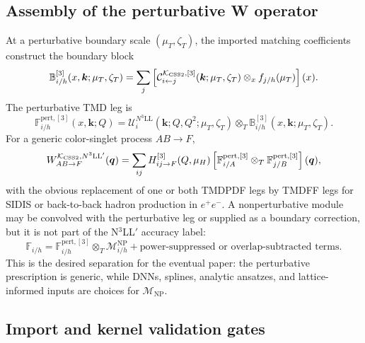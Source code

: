 \documentclass[11pt]{article}
\newcommand{\bk}{\bm{k}}
\newcommand{\bq}{\bm{q}}
\newcommand{\ot}{\otimes_T}
\newcommand{\ox}{\otimes_x}
\newcommand{\NP}{\mathrm{NP}}
\newcommand{\pert}{\mathrm{pert}}
\newcommand{\KCSS}{\mathcal K_{\rm CSS2}}
\begin{document}
\subsection{Assembly of the perturbative W operator}

At a perturbative boundary scale \((\mu_T,\zeta_T)\), the imported matching coefficients
construct the boundary block
\begin{equation}
  \mathbb B_{i/h}^{[3]}(x,\bk;\mu_T,\zeta_T)
  =
  \sum_j
  \left[
  \mathcal C_{i\leftarrow j}^{\KCSS,[3]}(\bk;\mu_T,\zeta_T)
  \ox f_{j/h}(\mu_T)
  \right](x).
  \label{eq:B-boundary-N3-v14}
\end{equation}
The perturbative TMD leg is
\begin{equation}
  \mathbb F_{i/h}^{\pert,[3]}(x,\bk;Q)
  =
  \mathcal U_i^{N^3\mathrm{LL}}(\bk;Q,Q^2;\mu_T,\zeta_T)
  \ot
  \mathbb B_{i/h}^{[3]}(x,\bk;\mu_T,\zeta_T).
  \label{eq:Fleg-N3-v14}
\end{equation}
For a generic color-singlet process \(AB\to F\),
\begin{equation}
  W_{AB\to F}^{\KCSS,N^3\mathrm{LL}'}(\bq)
  =
  \sum_{ij}
  H_{ij\to F}^{[3]}(Q,\mu_H)
  \left[
  \mathbb F_{i/A}^{\pert,[3]}
  \ot
  \mathbb F_{j/B}^{\pert,[3]}
  \right](\bq),
  \label{eq:W-generic-N3-v14}
\end{equation}
with the obvious replacement of one or both TMDPDF legs by TMDFF legs for SIDIS or
back-to-back hadron production in \(e^+e^-\).  A nonperturbative module may be convolved
with the perturbative leg or supplied as a boundary correction, but it is not part of the
N$^3$LL$'$ accuracy label:
\begin{equation}
  \mathbb F_{i/h}
  =
  \mathbb F_{i/h}^{\pert,[3]}
  \ot
  \mathcal M_{i/h}^{\NP}
  + \text{power-suppressed or overlap-subtracted terms} .
  \label{eq:NP-module-in-kernel-v14}
\end{equation}
This is the desired separation for the eventual paper: the perturbative prescription is
generic, while DNNs, splines, analytic ansatzes, and lattice-informed inputs are choices for
\(\mathcal M_{\NP}\).

\subsection{Import and kernel validation gates}
\end{document}
